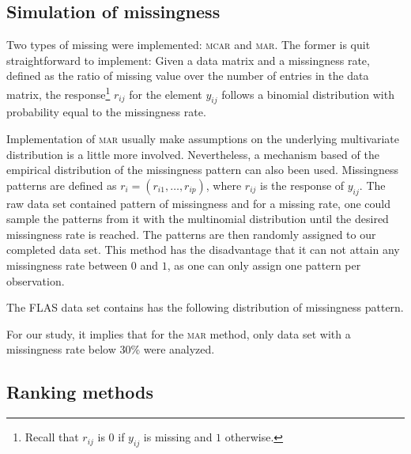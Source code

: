 \subsection{Simulation of missingness}

Two types of missing were implemented: \textsc{mcar} and \textsc{mar}. The
former is quit straightforward to implement: Given a data matrix and a
missingness rate, defined as the ratio of missing value over the number of
entries in the data matrix, the response\footnote{Recall that $r_{ij}$ is $0$
  if $y_{ij}$ is missing and $1$ otherwise.} $r_{ij}$ for the element $y_{ij}$
follows a binomial distribution with probability equal to the missingness rate.

Implementation of \textsc{mar} usually make assumptions on the underlying
multivariate distribution is a little more involved. Nevertheless, a mechanism
based of the empirical distribution of the missingness pattern can also been
used. Missingness patterns are defined as $r_{i} = (r_{i1}, \dots, r_{ip})$,
where $r_{ij}$ is the response of $y_{ij}$. The raw data set contained pattern
of missingness and for a missing rate, one could sample the patterns from it
with the multinomial distribution until the desired missingness rate is
reached. The patterns are then randomly assigned to our completed data
set. This method has the disadvantage that it can not attain any missingness
rate between $0$ and $1$, as one can only assign one pattern per observation.

The FLAS data set contains has the following distribution of missingness pattern.


For our study, it implies that for the \textsc{mar} method, only data set with
a missingness rate below 30\% were analyzed.

\subsection{Ranking methods}


